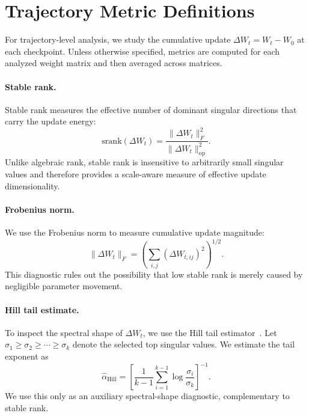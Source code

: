\section{Trajectory Metric Definitions}
\label{app:trajectory-metrics}

For trajectory-level analysis, we study the cumulative update
$\Delta W_t = W_t - W_0$ at each checkpoint. Unless otherwise specified,
metrics are computed for each analyzed weight matrix and then averaged
across matrices.

\paragraph{Stable rank.}
Stable rank measures the effective number of dominant singular directions
that carry the update energy:
\begin{equation}
    \mathrm{srank}(\Delta W_t)
    =
    \frac{\|\Delta W_t\|_F^2}
         {\|\Delta W_t\|_{\mathrm{op}}^2}.
\end{equation}
Unlike algebraic rank, stable rank is insensitive to arbitrarily small
singular values and therefore provides a scale-aware measure of effective
update dimensionality.

\paragraph{Frobenius norm.}
We use the Frobenius norm to measure cumulative update magnitude:
\begin{equation}
    \|\Delta W_t\|_F
    =
    \left(
    \sum_{i,j} (\Delta W_{t,ij})^2
    \right)^{1/2}.
\end{equation}
This diagnostic rules out the possibility that low stable rank is merely
caused by negligible parameter movement.

\paragraph{Hill tail estimate.}
To inspect the spectral shape of $\Delta W_t$, we use the Hill tail
estimator~\cite{8b55684a-14a0-31e4-b039-d044b4625cb8}. Let
$\sigma_1 \geq \sigma_2 \geq \cdots \geq \sigma_k$ denote the selected
top singular values. We estimate the tail exponent as
\begin{equation}
    \widehat{\alpha}_{\mathrm{Hill}}
    =
    \left[
    \frac{1}{k-1}
    \sum_{i=1}^{k-1}
    \log
    \frac{\sigma_i}{\sigma_k}
    \right]^{-1}.
\end{equation}
We use this only as an auxiliary spectral-shape diagnostic, complementary
to stable rank.


